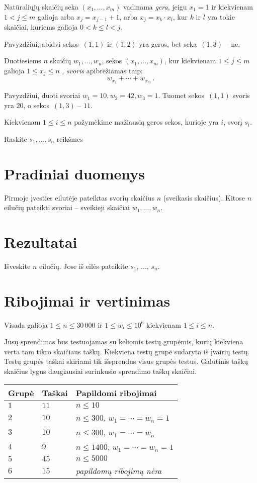 
\noindent
Natūraliųjų skaičių seka $(x_1,\ldots,x_m)$ vadinama \emph{gera}, jeigu  $x_1 = 1$ ir kiekvienam $1 < j \leq m$ galioja arba $x_j=x_{j-1}+1$, arba $x_j=x_k\cdot x_l$, kur $k$ ir $l$ yra tokie skaičiai, kuriems galioja $0< k\leq l< j$.

Pavyzdžiui, abidvi sekos~$(1,1)$ ir $(1,2)$ yra geros, bet seka~$(1,3)$ -- ne.

Duotiesiems $n$ skaičių $w_1,\ldots,w_n$, sekos $(x_1,\ldots,x_m)$, kur kiekvienam $1\leq j\leq m$
 galioja $1\leq x_j \leq n$ , \emph{svoris} apibrėžiamas taip:
\[ w_{x_1} +\cdots +w_{x_m}\,.\] 

Pavyzdžiui, duoti svoriai $w_1=10,  w_2=42,w_3= 1$. Tuomet sekos~$(1,1)$ svoris yra $20$, o sekos~$(1,3)$ -- $11$.

Kiekvienam $1\leq i\leq n$ pažymėkime mažiausią geros sekos, kurioje yra $i$, svorį $s_i$.

Raskite $s_1,\ldots ,s_n$ reikšmes

\section*{Pradiniai duomenys}

Pirmoje įvesties eilutėje pateiktas svorių skaičius $n$ (sveikasis skaičius).
Kitose $n$ eilučių pateikti svoriai -- sveikieji skaičiai $w_1, \ldots, w_n$.

\section*{Rezultatai}

Išveskite $n$ eilučių. Jose iš eilės pateikite $s_1$, $\ldots$, $s_n$.

\section*{Ribojimai ir vertinimas}

Visada galioja
$1\leq n \leq 30\,000$ %
ir
$1\leq w_i \leq 10^6$ kiekvienam $1\leq i \leq n$.%

Jūsų sprendimas bus testuojamas su keliomis testų grupėmis, kurių kiekviena verta tam tikro skaičiaus taškų.
Kiekviena testų grupė sudaryta iš įvairių testų.
Testų grupės taškai skiriami tik išsprendus visus grupės testus.
Galutinis taškų skaičius lygus daugiausiai surinkusio sprendimo taškų skaičiui.

\medskip
\begin{tabular}{lll}
Grupė & Taškai & Papildomi ribojimai \\\hline
$1$   & $11$ & $n\leq 10$ \\
$2$   & $10$ & $n\leq 300$, $w_1=\cdots=w_n = 1$ \\
$3$   & $10$ & $n\leq 300$, $w_1=\cdots=w_n$ \\ %
$4$   & $9$ & $n\leq 1400$, $w_1=\cdots=w_n = 1$ \\
$5$   & $45$ & $n\leq 5000$\\
$6$   & $15$ & \emph{papildomų ribojimų nėra}
\end{tabular}
